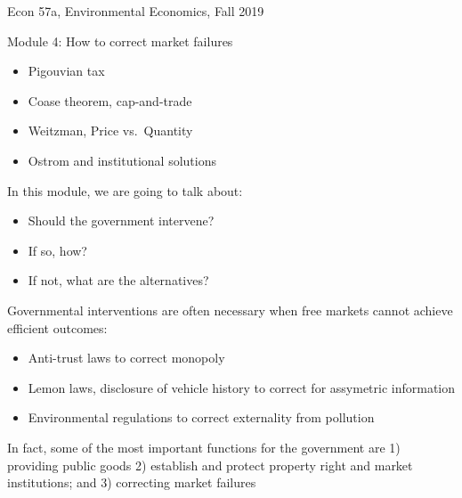 \begin{frame}{Econ 57a, Environmental Economics, Fall 2019}
\protect\hypertarget{econ-57a-environmental-economics-fall-2019}{}

\begin{block}{Module 4: How to correct market failures}

\begin{itemize}
\tightlist
\item
  Pigouvian tax
\item
  Coase theorem, cap-and-trade
\item
  Weitzman, Price vs.~Quantity
\item
  Ostrom and institutional solutions
\end{itemize}

\end{block}

\end{frame}

\begin{frame}{}
\protect\hypertarget{section}{}

In this module, we are going to talk about:

\begin{itemize}
\tightlist
\item
  Should the government intervene?
\item
  If so, how?
\item
  If not, what are the alternatives?
\end{itemize}

\end{frame}

\begin{frame}{}
\protect\hypertarget{section-1}{}

Governmental interventions are often necessary when free markets cannot
achieve efficient outcomes:

\begin{itemize}
\tightlist
\item
  Anti-trust laws to correct monopoly
\item
  Lemon laws, disclosure of vehicle history to correct for assymetric
  information
\item
  Environmental regulations to correct externality from pollution
\end{itemize}

In fact, some of the most important functions for the government are 1)
providing public goods 2) establish and protect property right and
market institutions; and 3) correcting market failures

\end{frame}

